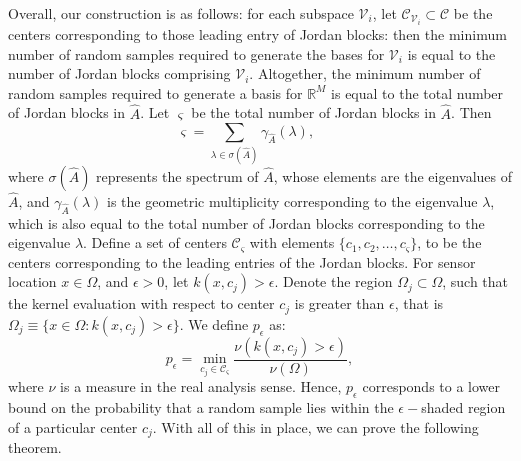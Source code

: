 \documentclass[letterpaper,12pt,peerreviewca,draftcls]{IEEEtran}
\newcommand{\e}{\epsilon}
\newcommand{\R}{\mathbb{R}}
\newcommand{\kernel}{k}
\newcommand{\empK}{\ensuremath{K}}
\newcommand{\dom}{\Omega}
\newcommand{\ncent}{M}
\newcommand{\shCent}{\mathcal{C}}
\newcommand{\geomMult}[1]{\gamma_{#1}}
\newcommand{\linvec}{v}
\newcommand{\minmeas}{\ell}
\newcommand{\linspace}{\mathcal{V}}
\newcommand{\measmap}{\widetilde{\empK}}
\newcommand{\dualop}{A}
\newcommand{\dualopApprox}{\widehat{\dualop}}
\newcommand{\rands}{\varsigma}
\newcommand{\measure}{\nu}
\begin{document}
Overall, our construction is as follows: for each subspace $ \linspace_i $, let $ \shCent_{\linspace_i} \subset \shCent $ be the centers corresponding to those leading entry of Jordan blocks: then the minimum number of random samples required to generate the bases for $ \linspace_i $ is equal to the number of Jordan blocks comprising $ \linspace_i $. Altogether, the minimum number of random samples required to generate a basis for $ \R^\ncent $ is equal to the total number of Jordan blocks in $ \dualopApprox $. Let $ \rands $ be the total number of Jordan blocks in $\dualopApprox$. Then
\begin{equation}\label{rands}
\rands = \sum_{\lambda \in \sigma(\dualopApprox)} \gamma_{\dualopApprox}(\lambda), \qquad %
\end{equation}
where $\sigma(\dualopApprox) $ represents the spectrum of $ \dualopApprox $, whose elements are the eigenvalues of $ \dualopApprox $, and $ \gamma_{\dualopApprox}(\lambda) $ is the geometric multiplicity corresponding to the eigenvalue $ \lambda $, which is also equal to the total number of Jordan blocks corresponding to the eigenvalue $ \lambda $. Define a set of centers $ \shCent_\rands $ with elements $ \{c_1, c_2,\dots, c_\rands\} $, to be the centers corresponding to the leading entries of  the Jordan blocks.
For sensor location $x\in\dom$, and $ \epsilon > 0 $, let $\kernel(x, c_j) > \epsilon$. Denote the region $\dom_j\subset\dom$, such that the kernel evaluation with respect to center $c_j$ is greater than $\e$, that is $ \dom_j \equiv \{x\in \dom:\kernel(x, c_j) > \epsilon\} $. We define
$ p_{\e} $ as:
\begin{equation}\label{ppp}
p_{\e} = \min_{c_j \in \shCent_\rands} \frac{\measure(\kernel(x, c_j) > \epsilon)}{\measure(\dom)},
\end{equation}
where $\measure$ is a measure in the real analysis sense. Hence, $p_{\e}$ corresponds to a lower bound on the probability that a random sample lies within the $ \epsilon-$shaded region of a particular center $ c_j$. With all of this in place, we can prove the following theorem.
\end{document}
